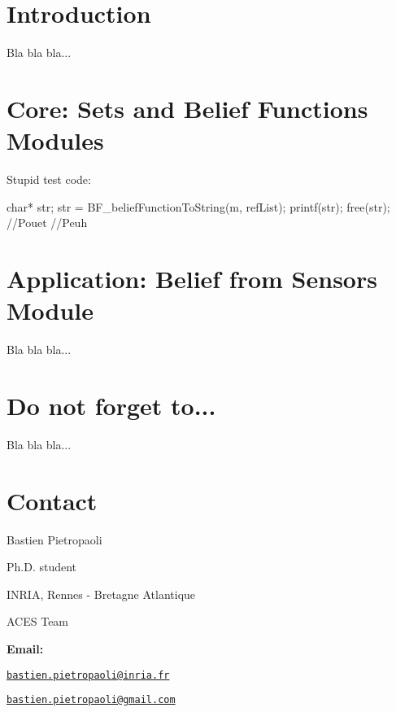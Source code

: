 \hypertarget{_tuto_Tuto_Intro}{}\section{Introduction}\label{_tuto_Tuto_Intro}
Bla bla bla...\hypertarget{_tuto_Tuto_BF}{}\section{Core: Sets and Belief Functions Modules}\label{_tuto_Tuto_BF}
Stupid test code: 
\begin{DoxyCode}
 char* str;
 str = BF_beliefFunctionToString(m, refList);
 printf(str);
 free(str);
      //Pouet
            //Peuh
\end{DoxyCode}
\hypertarget{_tuto_Tuto_BFS}{}\section{Application: Belief from Sensors Module}\label{_tuto_Tuto_BFS}
Bla bla bla...\hypertarget{_tuto_Tuto_DoNotForget}{}\section{Do not forget to...}\label{_tuto_Tuto_DoNotForget}
Bla bla bla...\hypertarget{_tuto_Tuto_contact}{}\section{Contact}\label{_tuto_Tuto_contact}
Bastien Pietropaoli \par
 Ph.D. student \par
 INRIA, Rennes -\/ Bretagne Atlantique \par
 ACES Team \par


{\bfseries Email:} \par
 \href{mailto:bastien.pietropaoli@inria.fr}{\tt bastien.pietropaoli@inria.fr} \par
 \href{mailto:bastien.pietropaoli@gmail.com}{\tt bastien.pietropaoli@gmail.com} \par
 